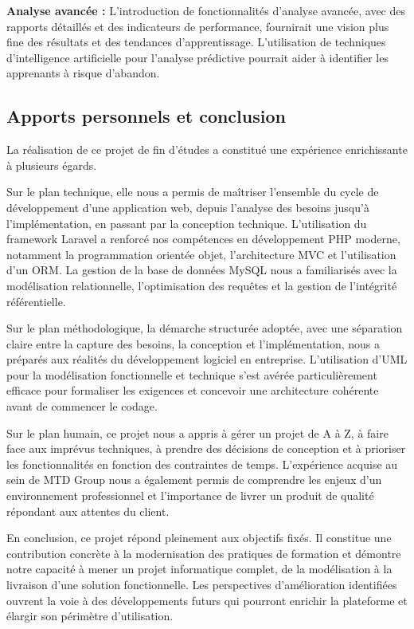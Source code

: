 \documentclass[12pt,a4paper]{report}
\begin{document}
\textbf{Analyse avancée :} L'introduction de fonctionnalités d'analyse avancée, avec des rapports détaillés et des indicateurs de performance, fournirait une vision plus fine des résultats et des tendances d'apprentissage. L'utilisation de techniques d'intelligence artificielle pour l'analyse prédictive pourrait aider à identifier les apprenants à risque d'abandon.

\subsection*{Apports personnels et conclusion}
La réalisation de ce projet de fin d'études a constitué une expérience enrichissante à plusieurs égards.

Sur le plan technique, elle nous a permis de maîtriser l'ensemble du cycle de développement d'une application web, depuis l'analyse des besoins jusqu'à l'implémentation, en passant par la conception technique. L'utilisation du framework Laravel a renforcé nos compétences en développement PHP moderne, notamment la programmation orientée objet, l'architecture MVC et l'utilisation d'un ORM. La gestion de la base de données MySQL nous a familiarisés avec la modélisation relationnelle, l'optimisation des requêtes et la gestion de l'intégrité référentielle.

Sur le plan méthodologique, la démarche structurée adoptée, avec une séparation claire entre la capture des besoins, la conception et l'implémentation, nous a préparés aux réalités du développement logiciel en entreprise. L'utilisation d'UML pour la modélisation fonctionnelle et technique s'est avérée particulièrement efficace pour formaliser les exigences et concevoir une architecture cohérente avant de commencer le codage.

Sur le plan humain, ce projet nous a appris à gérer un projet de A à Z, à faire face aux imprévus techniques, à prendre des décisions de conception et à prioriser les fonctionnalités en fonction des contraintes de temps. L'expérience acquise au sein de MTD Group nous a également permis de comprendre les enjeux d'un environnement professionnel et l'importance de livrer un produit de qualité répondant aux attentes du client.

En conclusion, ce projet répond pleinement aux objectifs fixés. Il constitue une contribution concrète à la modernisation des pratiques de formation et démontre notre capacité à mener un projet informatique complet, de la modélisation à la livraison d'une solution fonctionnelle. Les perspectives d'amélioration identifiées ouvrent la voie à des développements futurs qui pourront enrichir la plateforme et élargir son périmètre d'utilisation.
\end{document}
